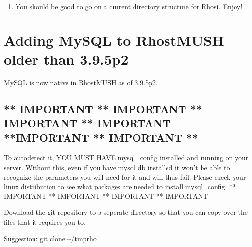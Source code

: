 \documentclass[letterpaper,10pt,english]{sphinxmanual}
\begin{document}
\begin{enumerate}
%
\setcounter{enumi}{8}
\item {} 
\sphinxAtStartPar
You should be good to go on a current directory structure for Rhost.  Enjoy!

\end{enumerate}


\section{Adding MySQL to RhostMUSH older than 3.9.5p2}
\label{\detokenize{34-upgrade:adding-mysql-to-rhostmush-older-than-3-9-5p2}}
\sphinxAtStartPar
MySQL is now native in RhostMUSH as of 3.9.5p2.


\subsection{** IMPORTANT ** IMPORTANT ** IMPORTANT ** IMPORTANT {\color{red}\bfseries{}**}IMPORTANT ** IMPORTANT **}
\label{\detokenize{34-upgrade:important-important-important-important-important-important}}
\sphinxAtStartPar
To autodetect it, YOU MUST HAVE mysql\_config installed and running
on your server.  Without this, even if you have mysql db installed
it won’t be able to recognize the parameters you will need for it
and will thus fail.  Please check your linux distribution to see
what packages are needed to install mysql\_config.
\sphinxstylestrong{***************************************************************************}
** IMPORTANT ** IMPORTANT ** IMPORTANT ** IMPORTANT 

\sphinxAtStartPar
Download the git repository to a seperate directory so that you can
copy over the files that it requires you to.

\sphinxAtStartPar
Suggestion:  git clone  \textasciitilde{}/tmprho
\end{document}
